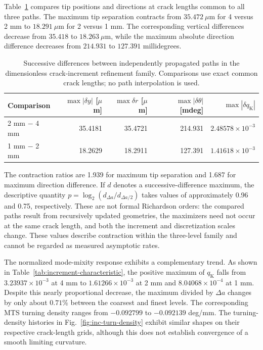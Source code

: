 \documentclass[pdflatex,sn-mathphys-num]{sn-jnl}
\begin{document}
Table~\ref{tab:increment-pairwise} compares tip positions
and directions at crack lengths common to all three paths.
The maximum tip separation contracts from
$35.472~\mu\mathrm{m}$ for 4 versus 2 mm to
$18.291~\mu\mathrm{m}$ for 2 versus 1 mm.
The corresponding vertical differences decrease from
$35.418$ to $18.263~\mu\mathrm{m}$, while the
maximum absolute direction difference decreases from
$214.931$ to $127.391$ millidegrees.

\begin{table}[htbp]
\centering
\small
\setlength{\tabcolsep}{4.0pt}
\caption{Successive differences between independently propagated paths in
the dimensionless crack-increment refinement family. Comparisons use exact
common crack lengths; no path interpolation is used.}
\label{tab:increment-pairwise}
\begin{tabular}{lrrrr}
\toprule
Comparison &
$\max|\delta y|$ [$\mu$m] &
$\max\delta r$ [$\mu$m] &
$\max|\delta\theta|$ [mdeg] &
$\max|\delta q_{\mathrm{K}}|$\\
\midrule
2 mm $-$ 4 mm & 35.4181 & 35.4721 & 214.931 & $2.48578\times10^{-3}$\\
1 mm $-$ 2 mm & 18.2629 & 18.2911 & 127.391 & $1.41618\times10^{-3}$\\
\bottomrule
\end{tabular}
\end{table}

The contraction ratios are 1.939 for maximum tip
separation and 1.687 for maximum direction difference.
If $d$ denotes a successive-difference maximum,
the descriptive quantity
$p=\log_2(d_{\Delta a}/d_{\Delta a/2})$
takes values of approximately 0.96 and 0.75,
respectively. These are not formal Richardson orders:
the compared paths result from recursively updated
geometries, the maximizers need not occur at the same
crack length, and both the increment and discretization
scales change. These values describe contraction within the three-level family
and cannot be regarded as measured asymptotic rates.

The normalized mode-mixity response exhibits a
complementary trend. As shown in
Table~\ref{tab:increment-characteristic}, the
positive maximum of $q_{\mathrm{K}}$ falls from
$3.23937\times10^{-3}$ at 4 mm to
$1.61266\times10^{-3}$ at 2 mm and
$8.04068\times10^{-4}$ at 1 mm.
Despite this nearly proportional decrease, the
maximum divided by $\Delta a$ changes by only
about $0.71\%$ between the coarsest and finest levels.
The corresponding MTS turning density ranges from
$-0.092799$ to $-0.092139$ deg/mm.
The turning-density histories in
Fig.~\ref{fig:inc-turn-density} exhibit similar shapes
on their respective crack-length grids, although this
does not establish convergence of a smooth limiting
curvature.
\end{document}

